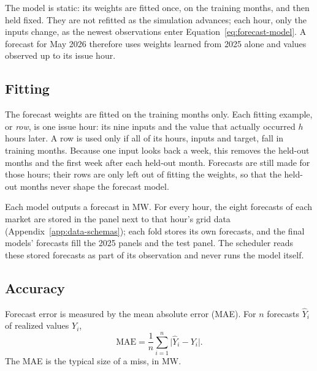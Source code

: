 \documentclass{UNCC-thesis}
\begin{document}
The model is static: its weights are fitted once, on the training months,
and then held fixed. They are not refitted as the simulation advances; each
hour, only the inputs change, as the newest observations enter
Equation~\eqref{eq:forecast-model}. A forecast for May 2026 therefore uses
weights learned from 2025 alone and values observed up to its issue hour.

\subsection{Fitting}
The forecast weights are fitted on the training months only. Each fitting
example, or \emph{row}, is one issue hour: its nine inputs and the value
that actually occurred \(h\) hours later. A row is used only if all of its
hours, inputs and target, fall in training months. Because one input looks
back a week, this removes the held-out months and the first week after each
held-out month. Forecasts are still made for those hours; their rows are
only left out of fitting the weights, so that the held-out months never
shape the forecast model.

Each model outputs a forecast in MW. For every hour, the eight forecasts of
each market are stored in the panel next to that hour's grid data
(Appendix~\ref{app:data-schemas}); each fold stores its own forecasts, and
the final models' forecasts fill the 2025 panels and the test panel. The
scheduler reads these stored forecasts as part of its observation and never
runs the model itself. 

\subsection{Accuracy}
Forecast error is measured by the mean absolute error (MAE). For \(n\)
forecasts \(\widehat Y_i\) of realized values \(Y_i\),
\begin{equation}
  \mathrm{MAE}
  =
  \frac{1}{n}\sum_{i=1}^{n}\bigl|\widehat Y_i-Y_i\bigr|.
  \label{eq:forecast-metrics}
\end{equation}
The MAE is the typical size of a miss, in MW.
\end{document}
